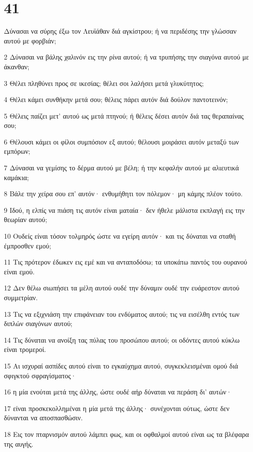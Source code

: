 \chapter{41}

\par Δύνασαι να σύρης έξω τον Λευϊάθαν διά αγκίστρου; ή να περιδέσης την γλώσσαν αυτού με φορβιάν;
\par 2 Δύνασαι να βάλης χαλινόν εις την ρίνα αυτού; ή να τρυπήσης την σιαγόνα αυτού με άκανθαν;
\par 3 Θέλει πληθύνει προς σε ικεσίας; θέλει σοι λαλήσει μετά γλυκύτητος;
\par 4 Θέλει κάμει συνθήκην μετά σου; θέλεις πάρει αυτόν διά δούλον παντοτεινόν;
\par 5 Θέλεις παίζει μετ' αυτού ως μετά πτηνού; ή θέλεις δέσει αυτόν διά τας θεραπαίνας σου;
\par 6 Θέλουσι κάμει οι φίλοι συμπόσιον εξ αυτού; θέλουσι μοιράσει αυτόν μεταξύ των εμπόρων;
\par 7 Δύνασαι να γεμίσης το δέρμα αυτού με βέλη; ή την κεφαλήν αυτού με αλιευτικά καμάκια;
\par 8 Βάλε την χείρα σου επ' αυτόν· ενθυμήθητι τον πόλεμον· μη κάμης πλέον τούτο.
\par 9 Ιδού, η ελπίς να πιάση τις αυτόν είναι ματαία· δεν ήθελε μάλιστα εκπλαγή εις την θεωρίαν αυτού;
\par 10 Ουδείς είναι τόσον τολμηρός ώστε να εγείρη αυτόν· και τις δύναται να σταθή έμπροσθεν εμού;
\par 11 Τις πρότερον έδωκεν εις εμέ και να ανταποδόσω; τα υποκάτω παντός του ουρανού είναι εμού.
\par 12 Δεν θέλω σιωπήσει τα μέλη αυτού ουδέ την δύναμιν ουδέ την ευάρεστον αυτού συμμετρίαν.
\par 13 Τις να εξιχνιάση την επιφάνειαν του ενδύματος αυτού; τις να εισέλθη εντός των διπλών σιαγόνων αυτού;
\par 14 Τις δύναται να ανοίξη τας πύλας του προσώπου αυτού; οι οδόντες αυτού κύκλω είναι τρομεροί.
\par 15 Αι ισχυραί ασπίδες αυτού είναι το εγκαύχημα αυτού, συγκεκλεισμέναι ομού διά σφιγκτού σφραγίσματος·
\par 16 η μία ενούται μετά της άλλης, ώστε ουδέ αήρ δύναται να περάση δι' αυτών·
\par 17 είναι προσκεκολλημέναι η μία μετά της άλλης· συνέχονται ούτως, ώστε δεν δύνανται να αποσπασθώσιν.
\par 18 Εις τον πταρνισμόν αυτού λάμπει φως, και οι οφθαλμοί αυτού είναι ως τα βλέφαρα της αυγής.
